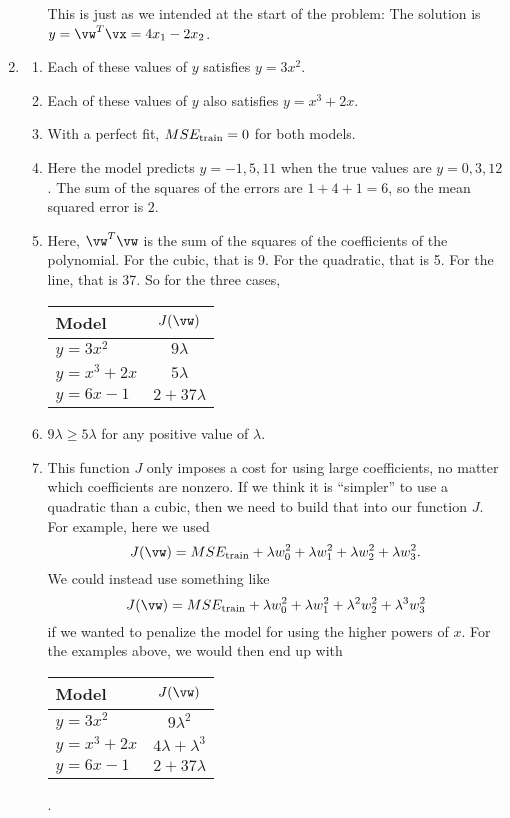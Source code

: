 \documentclass{article}
\newcommand{\strain}{_{\textnormal{train}}}
\begin{document}
\begin{enumerate}
\begin{enumerate}
    This is just as we intended at the start of the problem: The solution is $y = \vw^T\vx = 4x_1 - 2x_2$.
\end{enumerate}
    

\item \label{ML_ex_hyperparameter_solution}
\begin{enumerate}
    \item Each of these values of $y$ satisfies $y = 3x^2$.
    \item Each of these values of $y$ also satisfies $y = x^3 + 2x$.
    \item With a perfect fit, $MSE\strain = 0$ for both models.
    \item Here the model predicts $y = -1, 5, 11$ when the true values are $y = 0, 3, 12$. The sum of the squares of the errors are $1 + 4 + 1 = 6$, so the mean squared error is $2$.
    \item Here, $\vw^T\vw$ is the sum of the squares of the coefficients of the polynomial. For the cubic, that is 9. For the quadratic, that is 5. For the line, that is 37. So for the three cases,
    \begin{tabular}{l|c}
    Model & $J(\vw)$ \\
    \hline
    $y = 3x^2$     & $9\lambda$ \\
    $y = x^3 + 2x$ & $5\lambda$ \\
    $y = 6x - 1$   & $2 + 37\lambda$
    \end{tabular}
    \item $9\lambda \geq 5\lambda$ for any positive value of $\lambda$.
    \item This function $J$ only imposes a cost for using large coefficients, no matter which coefficients are nonzero. If we think it is ``simpler'' to use a quadratic than a cubic, then we need to build that into our function $J$. For example, here we used 
    \begin{equation*} J(\vw) = MSE\strain + \lambda w_0^2+\lambda w_1^2+\lambda w_2^2+\lambda w_3^2. \end{equation*}
    We could instead use something like
    \begin{equation*} J(\vw) = MSE\strain + \lambda w_0^2+\lambda w_1^2+ \lambda^2 w_2^2+ \lambda^3 w_3^2 \end{equation*}
    if we wanted to penalize the model for using the higher powers of $x$. For the examples above, we would then end up with

    \begin{tabular}{l|c}
    Model & $J(\vw)$ \\
    \hline
    $y = 3x^2$     & $9\lambda^2$ \\
    $y = x^3 + 2x$ & $4\lambda + \lambda^3$ \\
    $y = 6x - 1$   & $2 + 37\lambda$
    \end{tabular}.
    

\end{enumerate}
\end{enumerate}
\end{document}
